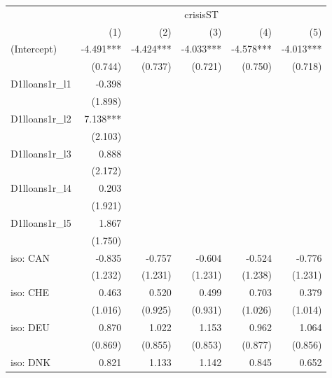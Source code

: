\begin{tabular}{lrrrrr}
\toprule
                  &                \multicolumn{5}{c}{crisisST}               \\ 
\cmidrule(lr){2-6} 
                  &       (1) &       (2) &       (3) &       (4) &       (5) \\ 
\midrule
(Intercept)       & -4.491*** & -4.424*** & -4.033*** & -4.578*** & -4.013*** \\ 
                  &   (0.744) &   (0.737) &   (0.721) &   (0.750) &   (0.718) \\ 
D1lloans1r\_l1    &    -0.398 &           &           &           &           \\ 
                  &   (1.898) &           &           &           &           \\ 
D1lloans1r\_l2    &  7.138*** &           &           &           &           \\ 
                  &   (2.103) &           &           &           &           \\ 
D1lloans1r\_l3    &     0.888 &           &           &           &           \\ 
                  &   (2.172) &           &           &           &           \\ 
D1lloans1r\_l4    &     0.203 &           &           &           &           \\ 
                  &   (1.921) &           &           &           &           \\ 
D1lloans1r\_l5    &     1.867 &           &           &           &           \\ 
                  &   (1.750) &           &           &           &           \\ 
iso: CAN          &    -0.835 &    -0.757 &    -0.604 &    -0.524 &    -0.776 \\ 
                  &   (1.232) &   (1.231) &   (1.231) &   (1.238) &   (1.231) \\ 
iso: CHE          &     0.463 &     0.520 &     0.499 &     0.703 &     0.379 \\ 
                  &   (1.016) &   (0.925) &   (0.931) &   (1.026) &   (1.014) \\ 
iso: DEU          &     0.870 &     1.022 &     1.153 &     0.962 &     1.064 \\ 
                  &   (0.869) &   (0.855) &   (0.853) &   (0.877) &   (0.856) \\ 
iso: DNK          &     0.821 &     1.133 &     1.142 &     0.845 &     0.652 \\ 

\end{tabular}
